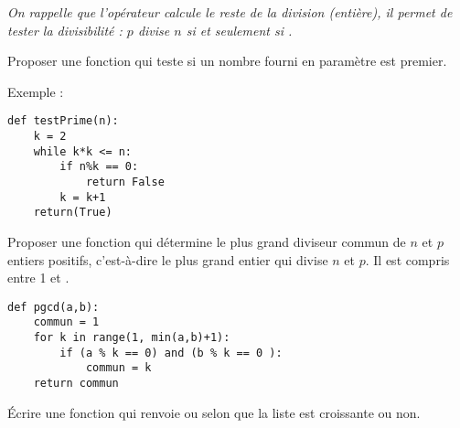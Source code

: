 \medskip
{\it On rappelle que l'opérateur \type{\%} calcule le reste de la division (entière), il permet de tester la divisibilité : $p$ divise $n$ si et seulement si .}
\begin{Exercise}Proposer une fonction   qui teste si un nombre fourni en paramètre
est premier.

Exemple :  
\end{Exercise}
\begin{Answer}
\begin{lstlisting}
def testPrime(n):
    k = 2
    while k*k <= n:
        if n%k == 0:
            return False
        k = k+1
    return(True)
\end{lstlisting}
\end{Answer}
\begin{Exercise}
Proposer une fonction  qui détermine le plus grand diviseur commun de $n$ et $p$ entiers positifs, c'est-à-dire le plus grand entier qui divise $n$ et $p$. Il est compris entre 1 et .
\end{Exercise}
\begin{Answer}
\begin{lstlisting}
def pgcd(a,b):
    commun = 1
    for k in range(1, min(a,b)+1):
        if (a % k == 0) and (b % k == 0 ):
            commun = k
    return commun
\end{lstlisting}
\end{Answer}
\begin{Exercise}
Écrire une fonction  qui renvoie  ou  selon que la liste est croissante ou non.
\end{Exercise}
